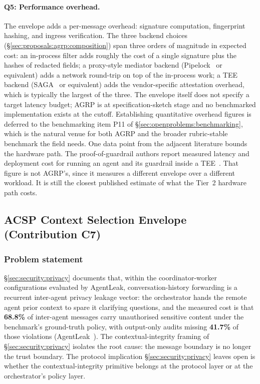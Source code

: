 \paragraph{Q5: Performance overhead.}
The envelope adds a per-message overhead: signature
computation, fingerprint hashing, and ingress
verification. The three backend choices
(\S\ref{sec:proposals:agrp:composition}) span three
orders of magnitude in expected cost: an in-process
filter adds roughly the cost of a single signature plus
the hashes of redacted fields; a proxy-style mediator
backend (Pipelock~\cite{pipelock} or equivalent) adds a
network round-trip on top of the in-process work; a TEE
backend (SAGA~\cite{saga2026} or equivalent) adds the
vendor-specific attestation overhead, which is typically
the largest of the three. The envelope itself does not
specify a target latency budget; AGRP is at
specification-sketch stage and no benchmarked
implementation exists at the cutoff. Establishing
quantitative overhead figures is deferred to the
benchmarking item P11 of
\S\ref{sec:openproblems:benchmarking}, which is the
natural venue for both AGRP and the broader
rubric-stable benchmark the field needs. One data point from
the adjacent literature bounds the hardware path. The
proof-of-guardrail authors report measured latency and
deployment cost for running an agent and its guardrail
inside a TEE~\cite{proof_of_guardrail}. That figure is not
AGRP's, since it measures a different envelope over a
different workload. It is still the closest published
estimate of what the Tier~2 hardware path costs.

\subsection{ACSP Context Selection Envelope (Contribution C7)}
\label{sec:proposals:acsp}

\subsubsection{Problem statement}
\label{sec:proposals:acsp:problem}

\S\ref{sec:security:privacy} documents that, within the
coordinator-worker configurations evaluated by AgentLeak,
conversation-history forwarding is a recurrent
inter-agent privacy leakage vector: the orchestrator hands
the remote agent prior context to spare it clarifying
questions, and the measured cost is that
\textbf{68.8\%} of inter-agent messages carry
unauthorised sensitive content under the benchmark's
ground-truth policy, with output-only audits
missing \textbf{41.7\%} of those violations
(AgentLeak~\cite{agentleak}). The contextual-integrity
framing of \S\ref{sec:security:privacy} isolates the root
cause: the message boundary is no longer the trust
boundary. The protocol implication
\S\ref{sec:security:privacy} leaves open is whether the
contextual-integrity primitive belongs at the protocol
layer or at the orchestrator's policy layer.

